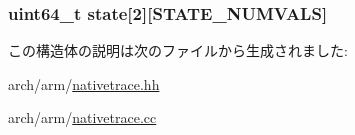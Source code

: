 \label{structTrace_1_1ArmNativeTrace_1_1ThreadState_a8e4b1b6cea994cadfac0ff9b33148ed9}
\hypertarget{structTrace_1_1ArmNativeTrace_1_1ThreadState_ad15783a90caf5a0b3cda1f7eec3e9351}{
\subsubsection[{state}]{\setlength{\rightskip}{0pt plus 5cm}uint64\_\-t {\bf state}\mbox{[}2\mbox{]}\mbox{[}STATE\_\-NUMVALS\mbox{]}}}
\label{structTrace_1_1ArmNativeTrace_1_1ThreadState_ad15783a90caf5a0b3cda1f7eec3e9351}


この構造体の説明は次のファイルから生成されました:\begin{DoxyCompactItemize}
\item 
arch/arm/\hyperlink{arch_2arm_2nativetrace_8hh}{nativetrace.hh}\item 
arch/arm/\hyperlink{arch_2arm_2nativetrace_8cc}{nativetrace.cc}\end{DoxyCompactItemize}
